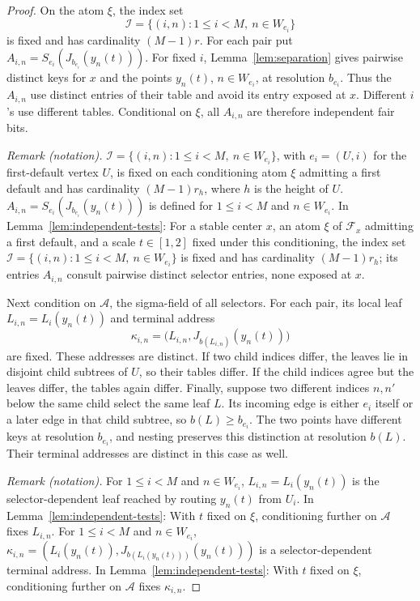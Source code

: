 \begin{proof}
On the atom \(\xi\), the index set
\[
 \mathcal I=\{(i,n):1\le i<M,\ n\in W_{e_i}\}
\]
is fixed and has cardinality \((M-1)r\). For each pair put
\(A_{i,n}=S_{e_i}(J_{b_{e_i}}(y_n(t)))\).
For fixed \(i\), Lemma~\ref{lem:separation} gives pairwise distinct
keys for \(x\) and the points \(y_n(t)\), \(n\in W_{e_i}\), at
resolution \(b_{e_i}\). Thus the \(A_{i,n}\) use distinct entries of
their table and avoid its entry exposed at \(x\). Different \(i\)'s
use different tables. Conditional on \(\xi\), all \(A_{i,n}\) are
therefore independent fair bits.

\noindent\textit{Remark (notation).} $\mathcal I=\{(i,n):1\le i<M,\ n\in W_{e_i}\}$, with $e_i=(U,i)$ for the first-default vertex $U$, is fixed on each conditioning atom $\xi$ admitting a first default and has cardinality $(M-1)r_h$, where $h$ is the height of $U$. $A_{i,n}=S_{e_i}(J_{b_{e_i}}(y_n(t)))$ is defined for $1\le i<M$ and $n\in W_{e_i}$. In Lemma~\ref{lem:independent-tests}: For a stable center $x$, an atom $\xi$ of $\mathcal F_x$ admitting a first default, and a scale $t\in[1,2]$ fixed under this conditioning, the index set $\mathcal I=\{(i,n):1\le i<M,\ n\in W_{e_i}\}$ is fixed and has cardinality $(M-1)r_h$; its entries $A_{i,n}$ consult pairwise distinct selector entries, none exposed at $x$.


Next condition on \(\mathcal A\), the sigma-field of all selectors.
For each pair, its local leaf \(L_{i,n}=L_i(y_n(t))\) and terminal
address
\[
 \kappa_{i,n}
 =\bigl(L_{i,n},J_{b(L_{i,n})}(y_n(t))\bigr)
\]
are fixed. These addresses are distinct. If two child indices differ,
the leaves lie in disjoint child subtrees of \(U\), so their tables
differ. If the child indices agree but the leaves differ, the tables
again differ. Finally, suppose two different indices \(n,n'\) below
the same child select the same leaf \(L\). Its incoming edge is either
\(e_i\) itself or a later edge in that child subtree, so
\(b(L)\ge b_{e_i}\). The two points have different keys at resolution
\(b_{e_i}\), and nesting preserves this distinction at resolution
\(b(L)\). Their terminal addresses are distinct in this case as well.

\noindent\textit{Remark (notation).} For $1\le i<M$ and $n\in W_{e_i}$, $L_{i,n}=L_i(y_n(t))$ is the selector-dependent leaf reached by routing $y_n(t)$ from $U_i$. In Lemma~\ref{lem:independent-tests}: With $t$ fixed on $\xi$, conditioning further on $\mathcal A$ fixes $L_{i,n}$. For $1\le i<M$ and $n\in W_{e_i}$, $\kappa_{i,n}=(L_i(y_n(t)),J_{b(L_i(y_n(t)))}(y_n(t)))$ is a selector-dependent terminal address. In Lemma~\ref{lem:independent-tests}: With $t$ fixed on $\xi$, conditioning further on $\mathcal A$ fixes $\kappa_{i,n}$.



\end{proof}
